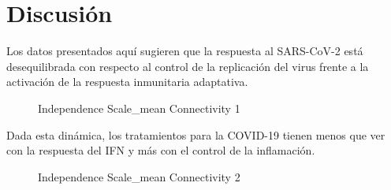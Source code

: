 \section{Discusión}
Los datos presentados aquí sugieren que la respuesta al SARS-CoV-2 está desequilibrada con respecto al control de la replicación del virus frente a la activación de la respuesta inmunitaria adaptativa.

\begin{figure}[h]
	\caption{Independence Scale_mean Connectivity 1}
	\label{fig:sample_clustering}
\end{figure}

Dada esta dinámica, los tratamientos para la COVID-19 tienen menos que ver con la respuesta del IFN y más con el control de la inflamación. 

\begin{figure}[!]
	\caption{Independence Scale_mean Connectivity 2}
	\label{fig:sample_clustering}
\end{figure}


